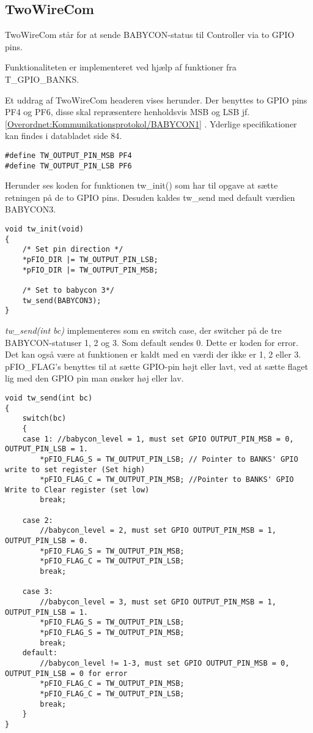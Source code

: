 \subsection{TwoWireCom}
TwoWireCom står for at sende BABYCON-status til Controller via to GPIO pins. 

Funktionaliteten er implementeret ved hjælp af funktioner fra T\_GPIO\_BANKS. 

Et uddrag af TwoWireCom headeren vises herunder.
Der benyttes to GPIO pins PF4 og PF6, disse skal repræsentere henholdsvis MSB og LSB jf. \ref{Overordnet:Kommunikationsprotokol/BABYCON1} . Yderlige specifikationer kan findes i databladet \citep{AD1836} side 84. 

\begin{verbatim}
#define TW_OUTPUT_PIN_MSB PF4
#define TW_OUTPUT_PIN_LSB PF6
\end{verbatim}

Herunder ses koden for funktionen tw\_init() som har til opgave at sætte retningen på de to GPIO pins. Desuden kaldes tw\_send med default værdien BABYCON3. 
\begin{verbatim}
void tw_init(void)
{
    /* Set pin direction */
    *pFIO_DIR |= TW_OUTPUT_PIN_LSB;
    *pFIO_DIR |= TW_OUTPUT_PIN_MSB;

    /* Set to babycon 3*/
    tw_send(BABYCON3);
}
\end{verbatim}

\textit{tw\_send(int bc)} implementeres som en switch case, der switcher på de tre BABYCON-statuser 1, 2 og 3. Som default sendes 0. Dette er koden for error. Det kan også være at funktionen er kaldt med en værdi der ikke er 1, 2 eller 3.  
pFIO\_FLAG's benyttes til at sætte GPIO-pin højt eller lavt, ved at sætte flaget lig med den GPIO pin man ønsker høj eller lav. 

\begin{verbatim}
void tw_send(int bc)
{
    switch(bc)
    {
    case 1:	//babycon_level = 1, must set GPIO OUTPUT_PIN_MSB = 0, OUTPUT_PIN_LSB = 1.
        *pFIO_FLAG_S = TW_OUTPUT_PIN_LSB; // Pointer to BANKS' GPIO write to set register (Set high)
        *pFIO_FLAG_C = TW_OUTPUT_PIN_MSB; //Pointer to BANKS' GPIO Write to Clear register (set low)
        break;

    case 2:
        //babycon_level = 2, must set GPIO OUTPUT_PIN_MSB = 1, OUTPUT_PIN_LSB = 0.
        *pFIO_FLAG_S = TW_OUTPUT_PIN_MSB;
        *pFIO_FLAG_C = TW_OUTPUT_PIN_LSB;
        break;

    case 3:
        //babycon_level = 3, must set GPIO OUTPUT_PIN_MSB = 1, OUTPUT_PIN_LSB = 1.
        *pFIO_FLAG_S = TW_OUTPUT_PIN_LSB;
        *pFIO_FLAG_S = TW_OUTPUT_PIN_MSB;
        break;
    default:
        //babycon_level != 1-3, must set GPIO OUTPUT_PIN_MSB = 0, OUTPUT_PIN_LSB = 0 for error
        *pFIO_FLAG_C = TW_OUTPUT_PIN_MSB;
        *pFIO_FLAG_C = TW_OUTPUT_PIN_LSB;
        break;
    }
}
\end{verbatim}
